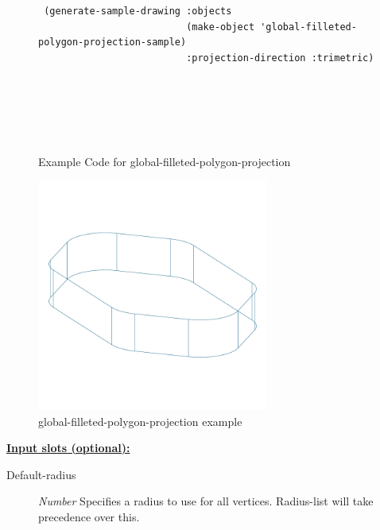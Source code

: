 \documentclass [11pt]{book}
\begin{document}
\begin{itemize}
\begin{figure}
\begin{lrbox}{\boxedverb}
\begin{minipage}{\linewidth}
{\begin{verbatim}
 (generate-sample-drawing :objects 
                          (make-object 'global-filleted-polygon-projection-sample)
                          :projection-direction :trimetric)






\end{verbatim}}
\end{minipage}
\end{lrbox}
\fbox{\usebox{\boxedverb}}

\caption{Example Code for global-filleted-polygon-projection}

\label{fig:example-code-global-filleted-polygon-projection}

\end{figure}

\begin{figure}
\begin{center}
\includegraphics[width=3in,height=3in]{../images/example-global-filleted-polygon-projection.pdf}
\end{center}

\caption{global-filleted-polygon-projection example}

\label{fig:global-filleted-polygon-projection}

\end{figure}





\textbf{
\underline{Input slots (optional):}}

\begin{description}

\item [Default-radius]
\emph{Number} Specifies a radius to use for all vertices. Radius-list will take precedence over this.



\end{description}
\end{itemize}
\end{document}
